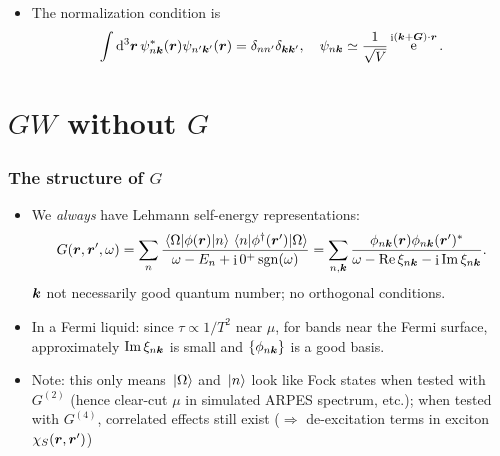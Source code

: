 \documentclass[t]{beamer}
\DeclareMathOperator{\ee}{e}
\DeclareMathOperator{\ii}{i}
\DeclareMathOperator{\sgn}{sgn}
\begin{document}
\begin{frame}[allowframebreaks]
\begin{itemize}
        \item The normalization condition is 
        \begin{equation}
            \int \dd[3]{\vb*{r}} \psi^*_{n \vb*{k}} (\vb*{r}) \psi_{n' \vb*{k}'}(\vb*{r})
            = \delta_{n n'} \delta_{\vb*{k} \vb*{k}'}, \quad 
            \psi_{n \vb*{k}} \simeq \frac{1}{\sqrt{V}} \ee^{\ii (\vb*{k} + \vb*{G}) \cdot \vb*{r}}.
        \end{equation}
\end{itemize}

\end{frame}

\section{$GW$ without $G$}

\begin{frame}
\frametitle{The structure of $G$}

\begin{itemize}
    \item We \emph{always} have Lehmann self-energy representations:
    \begin{equation}
        G(\vb*{r}, \vb*{r}', \omega) = \sum_n \frac{
            \mel{\Omega}{\phi(\vb*{r})}{n} \mel{n}{\phi^\dagger(\vb*{r}')}{\Omega}
        }{
            \omega - E_n + \ii 0^+ \sgn(\omega)
        }  
        = \sum_{n, \vb*{k}} 
        \frac{\phi_{n \vb*{k}}(\vb*{r}) \phi_{n \vb*{k}}(\vb*{r}')^*}{
            \omega - \Re \xi_{n \vb*{k}} - \ii \Im \xi_{n \vb*{k}}
        }.
    \end{equation}
    $\vb*{k}$ not necessarily good quantum number; 
    no orthogonal conditions. 
    \item In a Fermi liquid: since $\tau \propto 1 / T^2$ near $\mu$, 
    for bands near the Fermi surface, 
    approximately $\Im \xi_{n \vb*{k}}$ is small and $\{\phi_{n \vb*{k}}\}$ is a good basis. 
    \item Note: this only means $\ket*{\Omega}$ and $\ket*{n}$ look like 
        Fock states when tested with $G^{(2)}$ 
        (hence clear-cut $\mu$ in simulated ARPES spectrum, etc.); 
        when tested with $G^{(4)}$, correlated effects still exist 
        ($\Rightarrow$ de-excitation terms in exciton $\chi_S(\vb*{r}, \vb*{r}')$) 
\end{itemize}

\end{frame}
\end{document}
